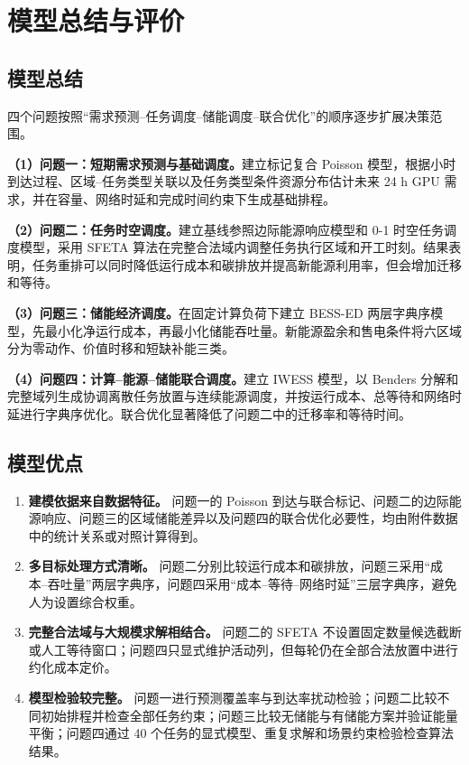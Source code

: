 \section{模型总结与评价}

\subsection{模型总结}

四个问题按照“需求预测--任务调度--储能调度--联合优化”的顺序逐步扩展决策范围。

\noindent\textbf{（1）问题一：短期需求预测与基础调度。}\quad 建立标记复合 Poisson 模型，根据小时到达过程、区域--任务类型关联以及任务类型条件资源分布估计未来 24 h GPU 需求，并在容量、网络时延和完成时间约束下生成基础排程。

\noindent\textbf{（2）问题二：任务时空调度。}\quad 建立基线参照边际能源响应模型和 0-1 时空任务调度模型，采用 SFETA 算法在完整合法域内调整任务执行区域和开工时刻。结果表明，任务重排可以同时降低运行成本和碳排放并提高新能源利用率，但会增加迁移和等待。

\noindent\textbf{（3）问题三：储能经济调度。}\quad 在固定计算负荷下建立 BESS-ED 两层字典序模型，先最小化净运行成本，再最小化储能吞吐量。新能源盈余和售电条件将六区域分为零动作、价值时移和短缺补能三类。

\noindent\textbf{（4）问题四：计算--能源--储能联合调度。}\quad 建立 IWESS 模型，以 Benders 分解和完整域列生成协调离散任务放置与连续能源调度，并按运行成本、总等待和网络时延进行字典序优化。联合优化显著降低了问题二中的迁移率和等待时间。

\subsection{模型优点}

\begin{enumerate}
    \item \textbf{建模依据来自数据特征。} 问题一的 Poisson 到达与联合标记、问题二的边际能源响应、问题三的区域储能差异以及问题四的联合优化必要性，均由附件数据中的统计关系或对照计算得到。

    \item \textbf{多目标处理方式清晰。} 问题二分别比较运行成本和碳排放，问题三采用“成本--吞吐量”两层字典序，问题四采用“成本--等待--网络时延”三层字典序，避免人为设置综合权重。

    \item \textbf{完整合法域与大规模求解相结合。} 问题二的 SFETA 不设置固定数量候选截断或人工等待窗口；问题四只显式维护活动列，但每轮仍在全部合法放置中进行约化成本定价。

    \item \textbf{模型检验较完整。} 问题一进行预测覆盖率与到达率扰动检验；问题二比较不同初始排程并检查全部任务约束；问题三比较无储能与有储能方案并验证能量平衡；问题四通过 40 个任务的显式模型、重复求解和场景约束检验检查算法结果。
\end{enumerate}

